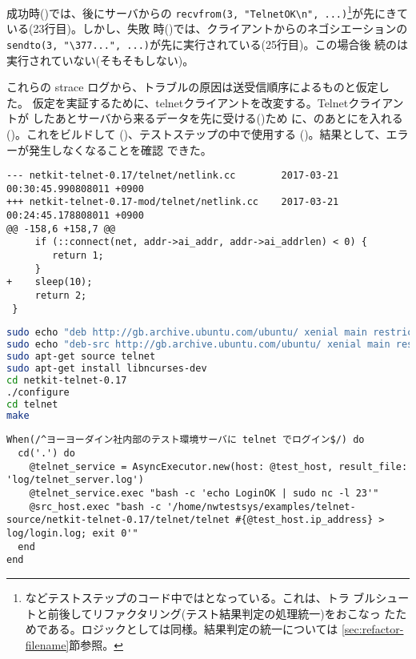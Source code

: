 成功時()では、後にサーバからの
\verb|recvfrom(3, "TelnetOK\n", ...)|\footnote{
などテストステップのコード中ではとなっている。これは、トラ
ブルシュートと前後してリファクタリング(テスト結果判定の処理統一)をおこなっ
たためである。ロジックとしては同様。結果判定の統一については
\ref{sec:refactor-filename}節参照。}が先にきている(23行目)。しかし、失敗
時()では、クライアントからのネゴシエーションの
\verb|sendto(3, "\377...", ...)|が先に実行されている(25行目)。この場合後
続のは実行されていない(そもそもしない)。

これらの strace ログから、トラブルの原因は送受信順序によるものと仮定した。
仮定を実証するために、telnetクライアントを改変する。Telnetクライアントが
したあとサーバから来るデータを先に受ける()ため
に、のあとにを入れる
()。これをビルドして
()、テストステップの中で使用する
()。結果として、エラーが発生しなくなることを確認
できた。

\begin{lstlisting}[caption=telnetクライアント改変,label=lst:modified-telnet-client]
--- netkit-telnet-0.17/telnet/netlink.cc        2017-03-21 00:30:45.990808011 +0900
+++ netkit-telnet-0.17-mod/telnet/netlink.cc    2017-03-21 00:24:45.178808011 +0900
@@ -158,6 +158,7 @@
     if (::connect(net, addr->ai_addr, addr->ai_addrlen) < 0) {
        return 1;
     }
+    sleep(10);
     return 2;
 }
\end{lstlisting}

\begin{lstlisting}[language=sh,caption=telnetクライアントのビルド手順,label=lst:howto-build-telnet]
sudo echo "deb http://gb.archive.ubuntu.com/ubuntu/ xenial main restricted" | sudo tee -a /etc/apt/sources.list
sudo echo "deb-src http://gb.archive.ubuntu.com/ubuntu/ xenial main restricted" | sudo tee -a /etc/apt/sources.list
sudo apt-get source telnet
sudo apt-get install libncurses-dev
cd netkit-telnet-0.17
./configure
cd telnet
make
\end{lstlisting}

\begin{lstlisting}[caption=改変telnetクライアントの使用,label=lst:telnet-step,linebackgroundcolor={\ifnum\value{lstnumber}=5 \color{green!30}\fi}]
When(/^ヨーヨーダイン社内部のテスト環境サーバに telnet でログイン$/) do
  cd('.') do
    @telnet_service = AsyncExecutor.new(host: @test_host, result_file: 'log/telnet_server.log')
    @telnet_service.exec "bash -c 'echo LoginOK | sudo nc -l 23'"
    @src_host.exec "bash -c '/home/nwtestsys/examples/telnet-source/netkit-telnet-0.17/telnet/telnet #{@test_host.ip_address} > log/login.log; exit 0'"
  end
end
\end{lstlisting}

